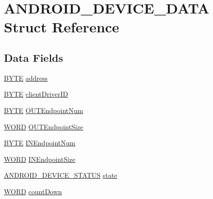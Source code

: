 \hypertarget{struct_a_n_d_r_o_i_d___d_e_v_i_c_e___d_a_t_a}{}\section{A\+N\+D\+R\+O\+I\+D\+\_\+\+D\+E\+V\+I\+C\+E\+\_\+\+D\+A\+T\+A Struct Reference}
\label{struct_a_n_d_r_o_i_d___d_e_v_i_c_e___d_a_t_a}
\subsection*{Data Fields}
\begin{DoxyCompactItemize}
\item 
\hyperlink{_generic_type_defs_8h_a4ae1dab0fb4b072a66584546209e7d58}{B\+Y\+T\+E} \hyperlink{struct_a_n_d_r_o_i_d___d_e_v_i_c_e___d_a_t_a_a92fb5ea5b6a7d108dea33dd07809152d}{address}
\item 
\hyperlink{_generic_type_defs_8h_a4ae1dab0fb4b072a66584546209e7d58}{B\+Y\+T\+E} \hyperlink{struct_a_n_d_r_o_i_d___d_e_v_i_c_e___d_a_t_a_a343912ad63712ea60903f5acd92efc9e}{client\+Driver\+I\+D}
\item 
\hyperlink{_generic_type_defs_8h_a4ae1dab0fb4b072a66584546209e7d58}{B\+Y\+T\+E} \hyperlink{struct_a_n_d_r_o_i_d___d_e_v_i_c_e___d_a_t_a_afb37190e1ad2ff34ef689f8bbd4d8561}{O\+U\+T\+Endpoint\+Num}
\item 
\hyperlink{_generic_type_defs_8h_a2b0e863dadf920709ec53d9088ee7c91}{W\+O\+R\+D} \hyperlink{struct_a_n_d_r_o_i_d___d_e_v_i_c_e___d_a_t_a_a19475445ed80ecf6b3f56a71de32d8a4}{O\+U\+T\+Endpoint\+Size}
\item 
\hyperlink{_generic_type_defs_8h_a4ae1dab0fb4b072a66584546209e7d58}{B\+Y\+T\+E} \hyperlink{struct_a_n_d_r_o_i_d___d_e_v_i_c_e___d_a_t_a_af3a41b73d0e9a33906b41e96d2ea565b}{I\+N\+Endpoint\+Num}
\item 
\hyperlink{_generic_type_defs_8h_a2b0e863dadf920709ec53d9088ee7c91}{W\+O\+R\+D} \hyperlink{struct_a_n_d_r_o_i_d___d_e_v_i_c_e___d_a_t_a_a01e21478fa49870d4b758ec1f03d5eb4}{I\+N\+Endpoint\+Size}
\item 
\hyperlink{usb__host__android_8c_a09a2851a80ce2bb603d4569e8d9ad3e8}{A\+N\+D\+R\+O\+I\+D\+\_\+\+D\+E\+V\+I\+C\+E\+\_\+\+S\+T\+A\+T\+U\+S} \hyperlink{struct_a_n_d_r_o_i_d___d_e_v_i_c_e___d_a_t_a_af0ed56d15cd2b245be3ded7b13dbb60b}{state}
\item 
\hyperlink{_generic_type_defs_8h_a2b0e863dadf920709ec53d9088ee7c91}{W\+O\+R\+D} \hyperlink{struct_a_n_d_r_o_i_d___d_e_v_i_c_e___d_a_t_a_a32f4bffa826f792cc540b059118f9d39}{count\+Down}

\end{DoxyCompactItemize}

